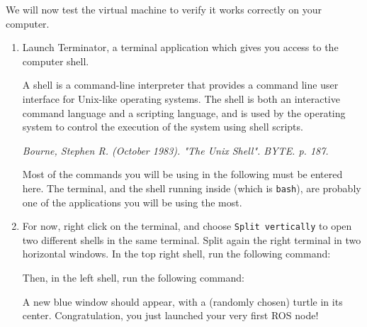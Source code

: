 \documentclass[10pt,a4paper,printanswers]{upmc}
\begin{document}
We will now test the virtual machine to verify it works correctly on your computer.


\begin{enumerate}
  \item Launch Terminator, a terminal application which gives you access to the computer shell.
        \begin{mdframed}[style=graybox]
          A shell is a command-line interpreter that provides a command line user interface for
          Unix-like operating systems. The shell is both an interactive command language and a
          scripting language, and is used by the operating system to control the execution of the
          system using shell scripts.
          \begin{flushright}
            \textit{Bourne, Stephen R. (October 1983). "The Unix Shell". BYTE. p. 187.}
          \end{flushright}
        \end{mdframed}
        Most of the commands you will be using in the following must be entered here. The terminal,
        and the shell running inside (which is \texttt{bash}), are probably one of the applications
        you will be using the most.

  \item For now, right click on the terminal, and choose \texttt{Split vertically} to open two
        different shells in the same terminal. Split again the right terminal in two horizontal
        windows. In the top right shell, run the following command:
        

        Then, in the left shell, run the following command:
        

        A new blue window should appear, with a (randomly chosen) turtle in its center.
        Congratulation, you just launched your very first ROS node!


\end{enumerate}
\end{document}

